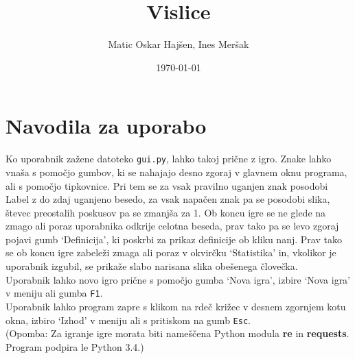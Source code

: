 \documentclass [a4paper, 12pt] {article}
\title {Vislice}
\author {Matic Oskar Hajšen, Ines Meršak}
\date {\today}
\begin{document}
\maketitle
\tableofcontents

\newpage

\section {Navodila za uporabo}
Ko uporabnik zažene datoteko \texttt {gui.py}, lahko takoj prične z igro. Znake lahko vnaša s pomočjo gumbov, ki se nahajajo desno zgoraj v glavnem oknu programa, ali s pomočjo tipkovnice. Pri tem se za vsak pravilno uganjen znak posodobi Label z do zdaj uganjeno besedo, za vsak napačen znak pa se posodobi slika, števec preostalih poskusov pa se zmanjša za 1. Ob koncu igre se ne glede na zmago ali poraz uporabnika odkrije celotna beseda, prav tako pa se levo zgoraj pojavi gumb `Definicija', ki poskrbi za prikaz definicije ob kliku nanj. Prav tako se ob koncu igre zabeleži zmaga ali poraz v okvirčku `Statistika' in, vkolikor je uporabnik izgubil, se prikaže slabo narisana slika obešenega človečka. \\
Uporabnik lahko novo igro prične s pomočjo gumba `Nova igra', izbire `Nova igra' v meniju ali gumba \texttt {F1}. \\
Uporabnik lahko program zapre s klikom na rdeč križec v desnem zgornjem kotu okna, izbiro `Izhod' v meniju ali s pritiskom na gumb \texttt {Esc}. \\
(Opomba: Za igranje igre morata biti nameščena Python modula \textbf {re} in \textbf {requests}. Program podpira le Python 3.4.)
\end{document}
